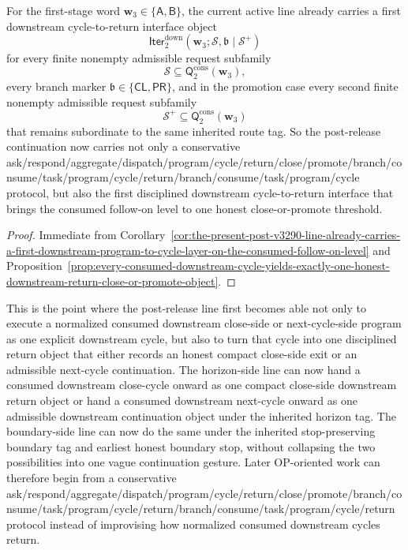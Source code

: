 \begin{corollary}
\label{cor:the-present-post-v3290-line-already-carries-a-first-downstream-cycle-to-return-interface-on-the-consumed-follow-on-level}
For the first-stage word \(\mathbf w_3\in\{\mathsf A,\mathsf B\}\), the current active line already carries a first downstream cycle-to-return interface object
\[
  \mathsf{Iter}^{\mathrm{down}}_{2}(\mathbf w_3;\mathcal S,\mathfrak b\mid\mathcal S^{+})
\]
for every finite nonempty admissible request subfamily
\[
  \mathcal S\subseteq \mathsf{Q}^{\mathrm{cons}}_{2}(\mathbf w_3),
\]
every branch marker \(\mathfrak b\in\{\mathsf{CL},\mathsf{PR}\}\), and in the promotion case every second finite nonempty admissible request subfamily
\[
  \mathcal S^{+}\subseteq \mathsf{Q}^{\mathrm{cons}}_{2}(\mathbf w_3)
\]
that remains subordinate to the same inherited route tag. So the post-release continuation now carries not only a conservative ask/respond/aggregate/dispatch/program/cycle/return/close/promote/branch/consume/task/program/cycle/return/branch/consume/task/program/cycle protocol, but also the first disciplined downstream cycle-to-return interface that brings the consumed follow-on level to one honest close-or-promote threshold.
\end{corollary}

\begin{proof}
Immediate from Corollary~\ref{cor:the-present-post-v3290-line-already-carries-a-first-downstream-program-to-cycle-layer-on-the-consumed-follow-on-level} and Proposition~\ref{prop:every-consumed-downstream-cycle-yields-exactly-one-honest-downstream-return-close-or-promote-object}.
\end{proof}

\begin{remark}
\label{rem:what-the-first-downstream-cycle-to-return-interface-on-the-consumed-follow-on-level-now-buys}
This is the point where the post-release line first becomes able not only to execute a normalized consumed downstream close-side or next-cycle-side program as one explicit downstream cycle, but also to turn that cycle into one disciplined return object that either records an honest compact close-side exit or an admissible next-cycle continuation. The horizon-side line can now hand a consumed downstream close-cycle onward as one compact close-side downstream return object or hand a consumed downstream next-cycle onward as one admissible downstream continuation object under the inherited horizon tag. The boundary-side line can now do the same under the inherited stop-preserving boundary tag and earliest honest boundary stop, without collapsing the two possibilities into one vague continuation gesture. Later OP-oriented work can therefore begin from a conservative ask/respond/aggregate/dispatch/program/cycle/return/close/promote/branch/consume/task/program/cycle/return/branch/consume/task/program/cycle/return protocol instead of improvising how normalized consumed downstream cycles return.
\end{remark}


